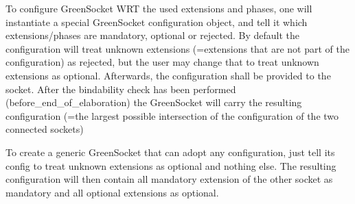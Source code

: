 \documentclass[a4paper,10pt]{article}          %
\begin{document}
To configure GreenSocket WRT the used extensions and phases, one will instantiate a special GreenSocket configuration object, and tell it which extensions/phases are mandatory, optional or rejected. By default the configuration will treat unknown extensions (=extensions that are not part of the configuration) as rejected, but the user may change that to treat unknown extensions as optional.
Afterwards, the configuration shall be provided to the socket. After the bindability check has been performed  (before\_end\_of\_elaboration) the GreenSocket will carry the resulting configuration (=the largest possible intersection of the configuration of the two connected sockets)

To create a generic GreenSocket that can adopt any configuration, just tell its config to treat unknown extensions as optional and nothing else. The resulting configuration will then contain all mandatory extension of the other socket as mandatory and all optional extensions as optional.







\end{document}
